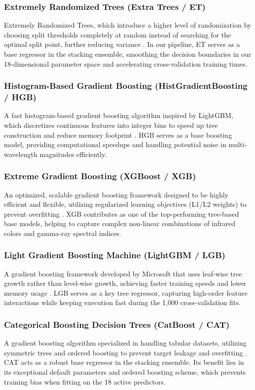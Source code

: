 \documentclass[twocolumn,linenumbers,floatfix]{aastex701}
\begin{document}
\subsubsection{Extremely Randomized Trees (Extra Trees / ET)}
Extremely Randomized Trees, which introduce a higher level of randomization by choosing split thresholds completely at random instead of searching for the optimal split point, further reducing variance \citep{Geurts2006}. In our pipeline, ET serves as a base regressor in the stacking ensemble, smoothing the decision boundaries in our 18-dimensional parameter space and accelerating cross-validation training times.

\subsubsection{Histogram-Based Gradient Boosting (HistGradientBoosting / HGB)}
A fast histogram-based gradient boosting algorithm inspired by LightGBM, which discretizes continuous features into integer bins to speed up tree construction and reduce memory footprint \citep{Ke2017}. HGB serves as a base boosting model, providing computational speedups and handling potential noise in multi-wavelength magnitudes efficiently.

\subsubsection{Extreme Gradient Boosting (XGBoost / XGB)}
An optimized, scalable gradient boosting framework designed to be highly efficient and flexible, utilizing regularized learning objectives (L1/L2 weights) to prevent overfitting \citep{Chen2016}. XGB contributes as one of the top-performing tree-based base models, helping to capture complex non-linear combinations of infrared colors and gamma-ray spectral indices.

\subsubsection{Light Gradient Boosting Machine (LightGBM / LGB)}
A gradient boosting framework developed by Microsoft that uses leaf-wise tree growth rather than level-wise growth, achieving faster training speeds and lower memory usage \citep{Ke2017}. LGB serves as a key tree regressor, capturing high-order feature interactions while keeping execution fast during the 1,000 cross-validation fits.

\subsubsection{Categorical Boosting Decision Trees (CatBoost / CAT)}
A gradient boosting algorithm specialized in handling tabular datasets, utilizing symmetric trees and ordered boosting to prevent target leakage and overfitting \citep{Prokhorenkova2018}. CAT acts as a robust base regressor in the stacking ensemble. Its benefit lies in its exceptional default parameters and ordered boosting scheme, which prevents training bias when fitting on the 18 active predictors.
\end{document}
